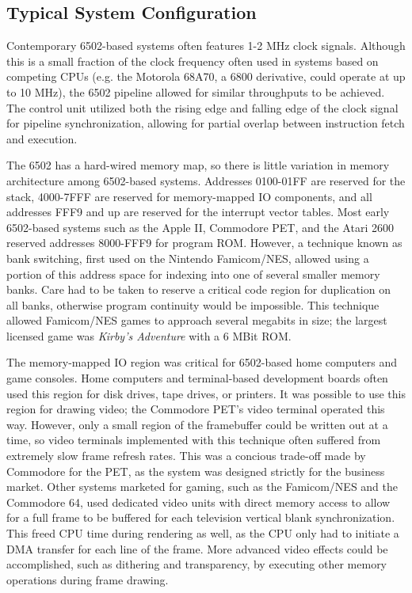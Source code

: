 \documentclass[journal]{IEEEtran}
\begin{document}
\subsection{Typical System Configuration}

Contemporary 6502-based systems often features 1-2 MHz clock signals. Although
this is a small fraction of the clock frequency often used in systems based on
competing CPUs (e.g. the Motorola 68A70, a 6800 derivative, could operate at up
to 10 MHz), the 6502 pipeline allowed for similar throughputs to be achieved.
The control unit utilized both the rising edge and falling edge of the clock
signal for pipeline synchronization, allowing for partial overlap between
instruction fetch and execution.

The 6502 has a hard-wired memory map, so there is little variation in memory
architecture among 6502-based systems. Addresses 0100-01FF are reserved for the
stack, 4000-7FFF are reserved for memory-mapped IO components, and all addresses
FFF9 and up are reserved for the interrupt vector tables. Most early 6502-based
systems such as the Apple II, Commodore PET, and the Atari 2600 reserved
addresses 8000-FFF9 for program ROM. However, a technique known as bank
switching, first used on the Nintendo Famicom/NES, allowed using a portion of
this address space for indexing into one of several smaller memory banks. Care
had to be taken to reserve a critical code region for duplication on all banks,
otherwise program continuity would be impossible. This technique allowed
Famicom/NES games to approach several megabits in size; the largest licensed
game was \emph{Kirby's Adventure} with a 6 MBit ROM.

The memory-mapped IO region was critical for 6502-based home computers and game
consoles. Home computers and terminal-based development boards often used this
region for disk drives, tape drives, or printers. It was possible to use this
region for drawing video; the Commodore PET's video terminal operated this way.
However, only a small region of the framebuffer could be written out at a time,
so video terminals implemented with this technique often suffered from extremely
slow frame refresh rates. This was a concious trade-off made by Commodore for
the PET, as the system was designed strictly for the business market. Other
systems marketed for gaming, such as the Famicom/NES and the Commodore 64, used
dedicated video units with direct memory access to allow for a full frame to be
buffered for each television vertical blank synchronization. This freed CPU time
during rendering as well, as the CPU only had to initiate a DMA transfer for
each line of the frame. More advanced video effects could be accomplished, such
as dithering and transparency, by executing other memory operations during frame
drawing.
\end{document}
